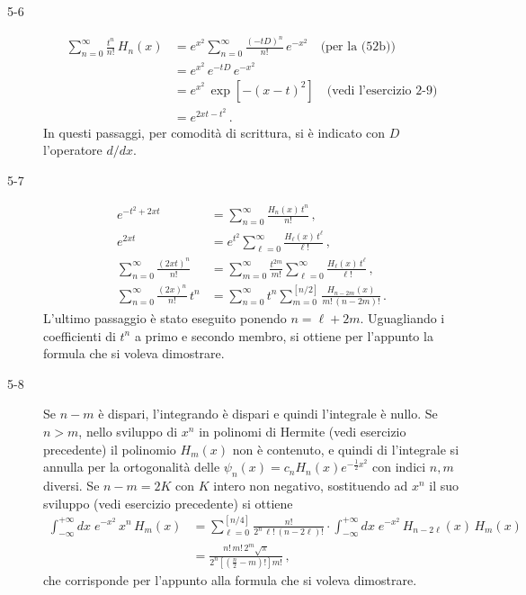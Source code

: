 \documentclass[11pt, a4paper]{book}
\numberwithin{equation}{section}
\begin{document}
\begin{description}
\item[5-6]
\begin{align*}
  \sum_{n=0}^{\infty} \frac{t^n}{n!}\, H_n(x)
  &= e^{x^2} \sum_{n=0}^{\infty} \frac{(-tD)^n}{n!}\, e^{-x^2}
    \quad\text{(per la (52b))}\\
  &= e^{x^2}\, e^{-tD}\, e^{-x^2}\\
  &= e^{x^2}\, \exp\!\left[-(x-t)^2\right]
    \quad\text{(vedi l'esercizio 2-9)}\\
  &= e^{2xt - t^2}\,.
\end{align*}
In questi passaggi, per comodità di scrittura, si è indicato con $D$ l'operatore $d/dx$.

\item[5-7]
\begin{align*}
  e^{-t^2+2xt} &= \sum_{n=0}^{\infty} \frac{H_n(x)\,t^n}{n!}\,,\\
  e^{2xt} &= e^{t^2}\sum_{\ell=0}^{\infty} \frac{H_\ell(x)\,t^\ell}{\ell!}\,,\\
  \sum_{n=0}^{\infty} \frac{(2xt)^n}{n!}
  &= \sum_{m=0}^{\infty} \frac{t^{2m}}{m!} \sum_{\ell=0}^{\infty} \frac{H_\ell(x)\,t^\ell}{\ell!}\,,\\
  \sum_{n=0}^{\infty} \frac{(2x)^n}{n!}\,t^n
  &= \sum_{n=0}^{\infty} t^n \sum_{m=0}^{[n/2]} \frac{H_{n-2m}(x)}{m!\,(n-2m)!}\,.
\end{align*}
L'ultimo passaggio è stato eseguito ponendo $n = \ell + 2m$. Uguagliando i coefficienti di $t^n$ a primo e secondo membro, si ottiene per l'appunto la formula che si voleva dimostrare.

\item[5-8] Se $n-m$ è dispari, l'integrando è dispari e quindi l'integrale è nullo. Se $n>m$, nello sviluppo di $x^n$ in polinomi di Hermite (vedi esercizio precedente) il polinomio $H_m(x)$ non è contenuto, e quindi di l'integrale si annulla per la ortogonalità delle $\psi_n(x) = c_n H_n(x) e^{-\frac{1}{2}x^2}$ con indici $n,m$ diversi. Se $n-m = 2K$ con $K$ intero non negativo, sostituendo ad $x^n$ il suo sviluppo (vedi esercizio precedente) si ottiene
\begin{align*}
  \int_{-\infty}^{+\infty} dx\; e^{-x^2}\, x^n\, H_m(x)
  &= \sum_{\ell=0}^{[n/4]} %
    \frac{n!}{2^n\,\ell!\,(n-2\ell)!}
    \cdot \int_{-\infty}^{+\infty} dx\; e^{-x^2}\, H_{n-2\ell}(x)\, H_m(x)\\
  &= \frac{n!\,m!\,2^m\sqrt{\pi}}{2^n\left[(\tfrac{n}{2}-m)!\right] m!}\,,
\end{align*}
che corrisponde per l'appunto alla formula che si voleva dimostrare.


\end{description}
\end{document}
